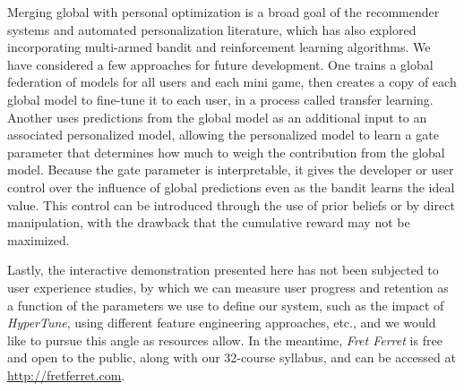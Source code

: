 \documentclass[manuscript, nonacm]{acmart_no_footer}
\begin{document}
Merging global with personal optimization is a broad goal of the recommender systems and automated personalization literature\cite{recsys_applications, recsys_survey_deep_learning}, which has also explored incorporating multi-armed bandit and reinforcement learning algorithms\cite{rl_recsys, rl_recsys2, rl_recsys3}. We have considered a few approaches for future development. One trains a global federation of models for all users and each mini game, then creates a copy of each global model to fine-tune it to each user, in a process called transfer learning\cite{transfer_learning, transfer_learning2}. Another uses predictions from the global model as an additional input to an associated personalized model, allowing the personalized model to learn a gate parameter that determines how much to weigh the contribution from the global model\cite{mason_bandtis_recsys}. Because the gate parameter is interpretable, it gives the developer or user control over the influence of global predictions even as the bandit learns the ideal value. This control can be introduced through the use of prior beliefs or by direct manipulation, with the drawback that the cumulative reward may not be maximized. 

Lastly, the interactive demonstration presented here has not been subjected to user experience studies, by which we can measure user progress and retention as a function of the parameters we use to define our system, such as the impact of \textit{HyperTune}, using different feature engineering approaches, etc., and we would like to pursue this angle as resources allow. In the meantime, \textit{Fret Ferret} is free and open to the public, along with our 32-course syllabus, and can be accessed at \url{http://fretferret.com}.





\end{document}
